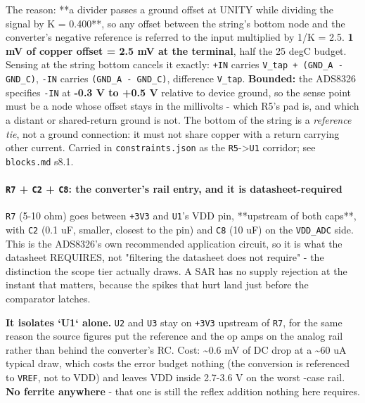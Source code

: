 \documentclass[11pt,a4paper]{article}
\begin{document}
The reason: {*}{*}a divider passes a ground offset at UNITY while dividing the signal by K = 0.400{*}{*}, so any offset between the string's bottom node and the converter's negative reference is referred to the input multiplied by 1/K = 2.5. \textbf{1 mV of copper offset = 2.5 mV at the terminal}, half the 25 degC budget. Sensing at the string bottom cancels it exactly: \texttt{+IN} carries \texttt{V\_tap + (GND\_A - GND\_C)}, \texttt{-IN} carries \texttt{(GND\_A - GND\_C)}, difference \texttt{V\_tap}. \textbf{Bounded:} the ADS8326 specifies \texttt{-IN} at \textbf{-0.3 V to +0.5 V} relative to device ground, so the sense point must be a node whose offset stays in the millivolts - which R5's pad is, and which a distant or shared-return ground is not. The bottom of the string is a \emph{reference tie}, not a ground connection: it must not share copper with a return carrying other current. Carried in \texttt{constraints.json} as the \texttt{R5}-\textgreater{}\texttt{U1} corridor; see \texttt{blocks.md} s8.1.

\paragraph*{\texttt{R7} + \texttt{C2} + \texttt{C8}: the converter's rail entry, and it is datasheet-required}
\texttt{R7} (5-10 ohm) goes between \texttt{+3V3} and \texttt{U1}'s VDD pin, {*}{*}upstream of both caps{*}{*}, with \texttt{C2} (0.1 uF, smaller, closest to the pin) and \texttt{C8} (10 uF) on the \texttt{VDD\_ADC} side. This is the ADS8326's own recommended application circuit, so it is what the datasheet REQUIRES, not "filtering the datasheet does not require" - the distinction the scope tier actually draws. A SAR has no supply rejection at the instant that matters, because the spikes that hurt land just before the comparator latches.

\textbf{It isolates `U1` alone.} \texttt{U2} and \texttt{U3} stay on \texttt{+3V3} upstream of \texttt{R7}, for the same reason the source figures put the reference and the op amps on the analog rail rather than behind the converter's RC. Cost: \textasciitilde{}0.6 mV of DC drop at a \textasciitilde{}60 uA typical draw, which costs the error budget nothing (the conversion is referenced to \texttt{VREF}, not to VDD) and leaves VDD inside 2.7-3.6 V on the worst -case rail. \textbf{No ferrite anywhere} - that one is still the reflex addition nothing here requires.
\end{document}
